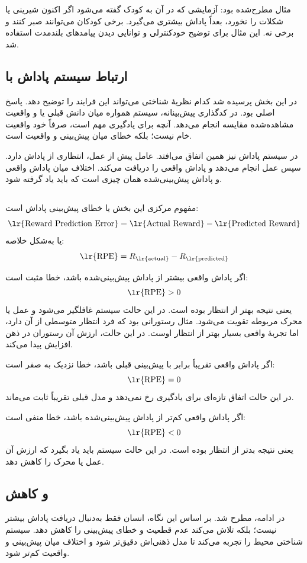 مثال مطرح‌شده  بود: آزمایشی که در آن به کودک گفته می‌شود اگر اکنون شیرینی یا شکلات را نخورد، بعداً پاداش بیشتری می‌گیرد. برخی کودکان می‌توانند صبر کنند و برخی نه. این مثال برای توضیح خودکنترلی و توانایی دیدن پیامدهای بلندمدت استفاده شد.

\subsection{ارتباط سیستم پاداش با }
در این بخش پرسیده شد کدام نظریهٔ شناختی می‌تواند این فرایند را توضیح دهد. پاسخ اصلی  بود. در کدگذاری پیش‌بینانه، سیستم همواره میان دانش قبلی یا  و واقعیت مشاهده‌شده مقایسه انجام می‌دهد. آنچه برای یادگیری مهم است، صرفاً خود واقعیت خام نیست؛ بلکه خطای میان پیش‌بینی و واقعیت است.

در سیستم پاداش نیز همین اتفاق می‌افتد. عامل پیش از عمل، انتظاری از پاداش دارد. سپس عمل انجام می‌دهد و پاداش واقعی را دریافت می‌کند. اختلاف میان پاداش واقعی و پاداش پیش‌بینی‌شده همان چیزی است که باید یاد گرفته شود.

\subsection{}
مفهوم مرکزی این بخش  یا خطای پیش‌بینی پاداش است:
\[
\text{\lr{Reward Prediction Error}} =
\text{\lr{Actual Reward}} - \text{\lr{Predicted Reward}}
\]
یا به‌شکل خلاصه:
\[
\text{\lr{RPE}} = R_{\text{\lr{actual}}} - R_{\text{\lr{predicted}}}
\]

اگر پاداش واقعی بیشتر از پاداش پیش‌بینی‌شده باشد، خطا مثبت است:
\[
\text{\lr{RPE}} > 0
\]
یعنی نتیجه بهتر از انتظار بوده است. در این حالت سیستم غافلگیر می‌شود و عمل یا محرک مربوطه تقویت می‌شود. مثال رستورانی بود که فرد انتظار متوسطی از آن دارد، اما تجربهٔ واقعی بسیار بهتر از انتظار اوست. در این حالت، ارزش آن رستوران در ذهن افزایش پیدا می‌کند.

اگر پاداش واقعی تقریباً برابر با پیش‌بینی قبلی باشد، خطا نزدیک به صفر است:
\[
\text{\lr{RPE}} = 0
\]
در این حالت اتفاق تازه‌ای برای یادگیری رخ نمی‌دهد و مدل قبلی تقریباً ثابت می‌ماند.

اگر پاداش واقعی کم‌تر از پاداش پیش‌بینی‌شده باشد، خطا منفی است:
\[
\text{\lr{RPE}} < 0
\]
یعنی نتیجه بدتر از انتظار بوده است. در این حالت سیستم باید یاد بگیرد که ارزش آن عمل یا محرک را کاهش دهد.

\subsection{ و کاهش }
در ادامه،  مطرح شد. بر اساس این نگاه، انسان فقط به‌دنبال دریافت پاداش بیشتر نیست؛ بلکه تلاش می‌کند عدم قطعیت و خطای پیش‌بینی را کاهش دهد. سیستم شناختی محیط را تجربه می‌کند تا مدل ذهنی‌اش دقیق‌تر شود و اختلاف میان پیش‌بینی و واقعیت کم‌تر شود.

